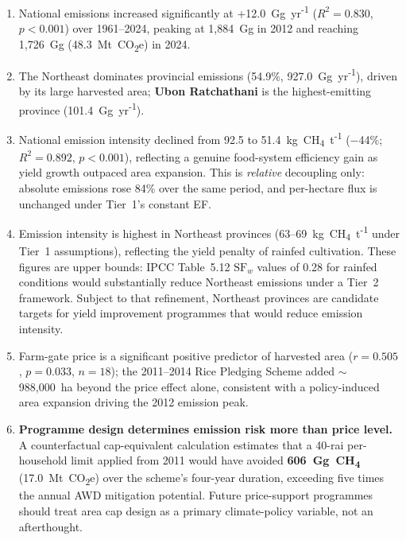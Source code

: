 \documentclass[fleqn,10pt]{olplainarticle}
\begin{document}
\begin{enumerate}[noitemsep]
  \item National emissions increased significantly at +12.0~Gg~yr\textsuperscript{-1}
        ($R^2 = 0.830$, $p < 0.001$) over 1961--2024, peaking at 1,884~Gg in 2012
        and reaching 1,726~Gg (48.3~Mt~CO\textsubscript{2}e) in 2024.

  \item The Northeast dominates provincial emissions (54.9\%, 927.0~Gg~yr\textsuperscript{-1}),
        driven by its large harvested area; \textbf{Ubon Ratchathani} is the
        highest-emitting province (101.4~Gg~yr\textsuperscript{-1}).

  \item National emission intensity declined from 92.5 to 51.4~kg~CH\textsubscript{4}~t\textsuperscript{-1}
        ($-$44\%; $R^2 = 0.892$, $p < 0.001$), reflecting a genuine food-system efficiency gain
        as yield growth outpaced area expansion.
        This is \textit{relative} decoupling only: absolute emissions rose 84\% over the
        same period, and per-hectare flux is unchanged under Tier~1's constant EF.

  \item Emission intensity is highest in Northeast provinces
        (63--69~kg~CH\textsubscript{4}~t\textsuperscript{-1} under Tier~1 assumptions),
        reflecting the yield penalty of rainfed cultivation.
        These figures are upper bounds: IPCC Table~5.12 $\text{SF}_w$ values
        of 0.28 for rainfed conditions would substantially reduce
        Northeast emissions under a Tier~2 framework.
        Subject to that refinement, Northeast provinces are candidate targets
        for yield improvement programmes that would reduce emission intensity.

  \item Farm-gate price is a significant positive predictor of harvested area
        ($r = 0.505$, $p = 0.033$, $n = 18$); the 2011--2014 Rice Pledging Scheme
        added $\sim$988,000~ha beyond the price effect alone, consistent with a
        policy-induced area expansion driving the 2012 emission peak.

  \item \textbf{Programme design determines emission risk more than price level.}
        A counterfactual cap-equivalent calculation estimates that a 40-rai
        per-household limit applied from 2011 would have avoided
        \textbf{606~Gg~CH\textsubscript{4}} (17.0~Mt~CO\textsubscript{2}e)
        over the scheme's four-year duration, exceeding five times the annual
        AWD mitigation potential.
        Future price-support programmes should treat area cap design as a
        primary climate-policy variable, not an afterthought.


\end{enumerate}
\end{document}
